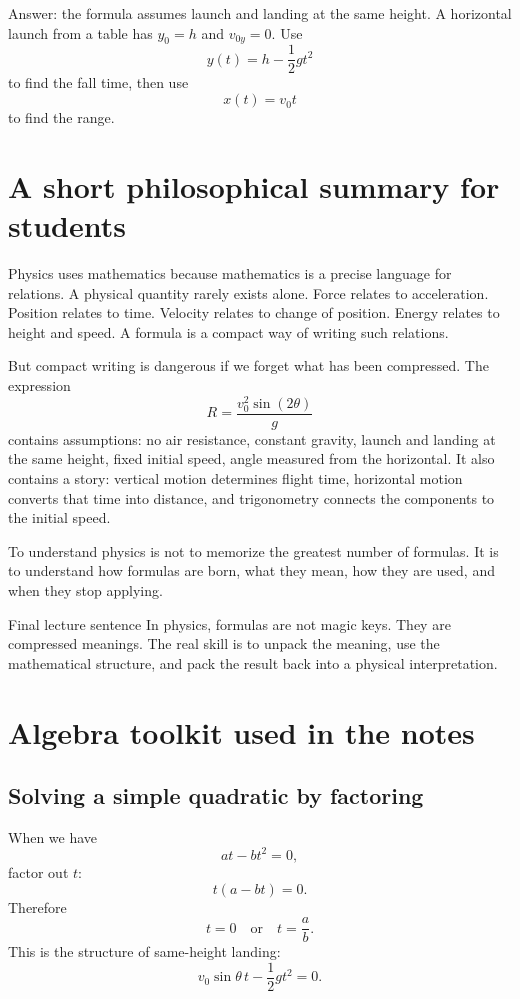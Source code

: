 \documentclass[11pt,a4paper]{article}
\begin{document}
Answer: the formula assumes launch and landing at the same height. A horizontal launch from a table has $y_0=h$ and $v_{0y}=0$. Use
\[
y(t)=h-\frac12gt^2
\]
to find the fall time, then use
\[
x(t)=v_0t
\]
to find the range.

\section{A short philosophical summary for students}

Physics uses mathematics because mathematics is a precise language for relations. A physical quantity rarely exists alone. Force relates to acceleration. Position relates to time. Velocity relates to change of position. Energy relates to height and speed. A formula is a compact way of writing such relations.

But compact writing is dangerous if we forget what has been compressed. The expression
\[
R=\frac{v_0^2\sin(2\theta)}{g}
\]
contains assumptions: no air resistance, constant gravity, launch and landing at the same height, fixed initial speed, angle measured from the horizontal. It also contains a story: vertical motion determines flight time, horizontal motion converts that time into distance, and trigonometry connects the components to the initial speed.

To understand physics is not to memorize the greatest number of formulas. It is to understand how formulas are born, what they mean, how they are used, and when they stop applying.

\begin{principlebox}{Final lecture sentence}
In physics, formulas are not magic keys. They are compressed meanings. The real skill is to unpack the meaning, use the mathematical structure, and pack the result back into a physical interpretation.
\end{principlebox}

\newpage

\appendix

\section{Algebra toolkit used in the notes}

\subsection{Solving a simple quadratic by factoring}

When we have
\[
at-bt^2=0,
\]
factor out $t$:
\[
t(a-bt)=0.
\]
Therefore
\[
t=0
\quad\text{or}\quad
 t=\frac{a}{b}.
\]
This is the structure of same-height landing:
\[
v_0\sin\theta\,t-\frac12gt^2=0.
\]
\end{document}
